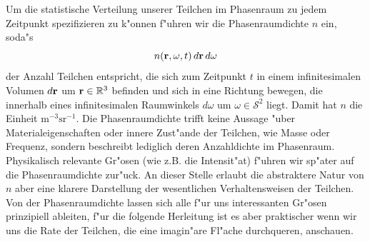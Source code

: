 \documentclass[11pt,a4paper,DIVcalc,BCOR8mm,titlepage,twoside]{scrartcl}
\begin{document}
	Um die statistische Verteilung unserer Teilchen im Phasenraum zu jedem Zeitpunkt spezifizieren zu k"onnen f"uhren wir die Phasenraumdichte $n$ ein, soda"s $$n(\mathbf{r},\omega,t)\,d\mathbf{r}\,d\omega$$ der Anzahl Teilchen entspricht, die sich zum Zeitpunkt $t$ in einem infinitesimalen Volumen $d\mathbf{r}$ um $\mathbf{r} \in \mathbb{R}^3$ befinden und sich in eine Richtung bewegen, die innerhalb eines infinitesimalen Raumwinkels $d\omega$ um $\omega \in \mathcal{S}^2$ liegt. Damit hat $n$ die Einheit $\text{m}^{-3}\text{sr}^{-1}$. Die Phasenraumdichte trifft keine Aussage "uber Materialeigenschaften oder innere Zust"ande der Teilchen, wie Masse oder Frequenz, sondern beschreibt lediglich deren Anzahldichte im Phasenraum. Physikalisch relevante Gr"osen (wie z.B. die Intensit"at) f"uhren wir sp"ater auf die Phasenraumdichte zur"uck. An dieser Stelle erlaubt die abstraktere Natur von $n$ aber eine klarere Darstellung der wesentlichen Verhaltensweisen der Teilchen. Von der Phasenraumdichte lassen sich alle f"ur uns interessanten Gr"osen prinzipiell ableiten, f"ur die folgende Herleitung ist es aber praktischer wenn wir uns die Rate der Teilchen, die eine imagin"are Fl"ache durchqueren, anschauen.
	
\end{document}
